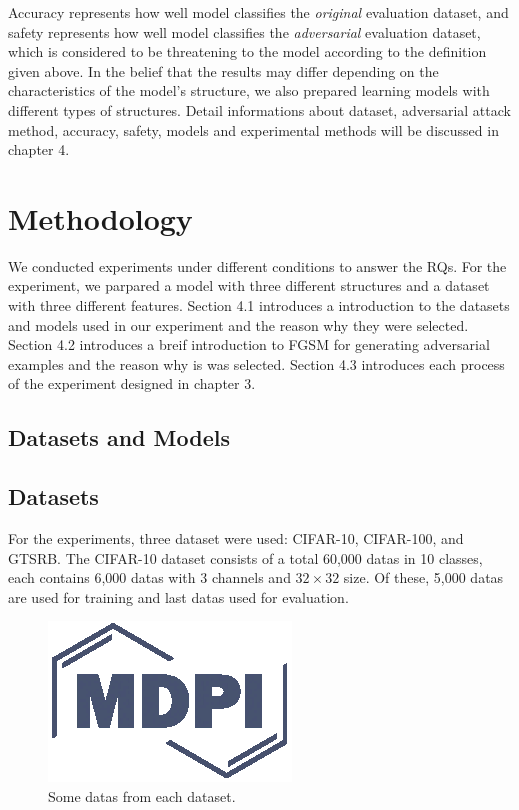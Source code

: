 \documentclass[journal,article,submit,moreauthors,pdftex]{Definitions/mdpi}
\begin{document}
Accuracy represents how well model classifies the {\it original} evaluation dataset, and safety represents how well model classifies the {\it adversarial} evaluation dataset, which is considered to be threatening to the model according to the definition given above.
In the belief that the results may differ depending on the characteristics of the model's structure, we also prepared learning models with different types of structures. 
Detail informations about dataset, adversarial attack method, accuracy, safety, models and experimental methods will be discussed in chapter 4.

\section{Methodology}

We conducted experiments under different conditions to answer the RQs. For the experiment, we parpared a model with three different structures and a dataset with three different features.
Section 4.1 introduces a introduction to the datasets and models used in our experiment and the reason why they were selected.
Section 4.2 introduces a breif introduction to FGSM for generating adversarial examples and the reason why is was selected.
Section 4.3 introduces each process of the experiment designed in chapter 3.

\subsection{Datasets and Models}

\subsection{Datasets}

For the experiments, three dataset were used: CIFAR-10, CIFAR-100, and GTSRB. The CIFAR-10 dataset consists of a total 60,000 datas in 10 classes, each contains 6,000 datas with 3 channels and \begin{math}{32\times 32}\end{math} size.
Of these, 5,000 datas are used for training and last datas used for evaluation.

\begin{figure}[H] 
\includegraphics[width=5 cm]{Definitions/logo-mdpi}
\caption{Some datas from each dataset.\label{fig3}}
\end{figure} 
\end{document}

